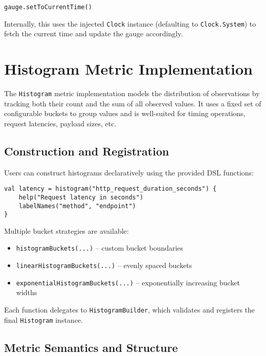 \begin{verbatim}
gauge.setToCurrentTime()
\end{verbatim}

Internally, this uses the injected \texttt{Clock} instance (defaulting to \texttt{Clock.System}) to fetch the current time and update the gauge accordingly.




\section{Histogram Metric Implementation}

The \texttt{Histogram} metric implementation models the distribution of observations by tracking both their count and the sum of all observed values. It uses a fixed set of configurable buckets to group values and is well-suited for timing operations, request latencies, payload sizes, etc.

\subsection{Construction and Registration}

Users can construct histograms declaratively using the provided DSL functions:

\begin{verbatim}
val latency = histogram("http_request_duration_seconds") {
    help("Request latency in seconds")
    labelNames("method", "endpoint")
}
\end{verbatim}

Multiple bucket strategies are available:
\begin{itemize}
    \item \texttt{histogramBuckets(...)} – custom bucket boundaries
    \item \texttt{linearHistogramBuckets(...)} – evenly spaced buckets
    \item \texttt{exponentialHistogramBuckets(...)} – exponentially increasing bucket widths
\end{itemize}

Each function delegates to \texttt{HistogramBuilder}, which validates and registers the final \texttt{Histogram} instance.

\subsection{Metric Semantics and Structure}

